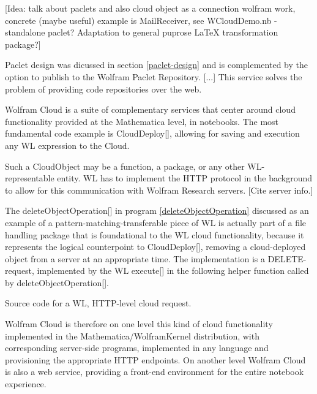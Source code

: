 [Idea: talk about paclets and also cloud object as a connection wolfram work, concrete (maybe useful) example is MailReceiver, see WCloudDemo.nb - standalone paclet? Adaptation to general puprose LaTeX transformation package?]

Paclet design was dicussed in section \ref{paclet-design} and is complemented by the option to publish to the Wolfram Paclet Repository. [...] This service solves the problem of providing code repositories over the web.

Wolfram Cloud is a suite of complementary services that center around cloud functionality provided at the Mathematica level, in notebooks. The most fundamental code example is CloudDeploy[], allowing for saving and execution any WL expression to the Cloud.

Such a CloudObject may be a function, a package, or any other WL-representable entity. WL has to implement the HTTP protocol in the background to allow for this communication with Wolfram Research servers. [Cite server info.]

The deleteObjectOperation[] in program \ref{deleteObjectOperation} discussed as an example of a pattern-matching-transferable piece of WL is actually part of a file handling package that is foundational to the WL cloud functionality, because it represents the logical counterpoint to CloudDeploy[], removing a cloud-deployed object from a server at an appropriate time. The implementation is a DELETE-request, implemented by the WL execute[] in the following helper function called by deleteObjectOperation[].

\begin{program} 
\caption{Source code for a WL, HTTP-level cloud request.}
\label{deleteCloudObject}
\end{program}

Wolfram Cloud is therefore on one level this kind of cloud functionality implemented in the Mathematica/WolframKernel distribution, with corresponding server-side programs, implemented in any language and provisioning the appropriate HTTP endpoints. On another level Wolfram Cloud is also a web service, providing a front-end environment for the entire notebook experience.

